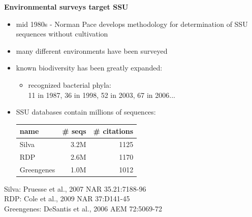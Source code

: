 \documentclass[landscape]{slides}
\begin{document}
\begin{slide}
\begin{center}

\textbf{Environmental surveys target SSU}
\end{center}
\medskip
\begin{minipage}{7in}
\small
\begin{itemize}
\item mid 1980s - Norman Pace develops methodology for determination
      of SSU sequences without cultivation
\item many different environments have been surveyed
\item known biodiversity has been greatly expanded:

\begin{itemize}
\item
  recognized bacterial phyla: \\
  11 in 1987, 36 in 1998, 52 in 2003, 67 in 2006...
\end{itemize}

\item SSU databases contain millions of sequences:
\begin{center}
\begin{tabular}{lrr}
  name & \# seqs & \# citations \\ \hline
  Silva & 3.2M & 1125 \\ 
  RDP   & 2.6M & 1170 \\
  Greengenes & 1.0M & 1012 \\
\end{tabular}
\end{center}
\end{itemize}

\tiny
Silva: Pruesse et al., 2007 NAR 35.21:7188-96 \\
RDP: Cole et al., 2009 NAR 37:D141-45 \\
Greengenes: DeSantis et al., 2006 AEM 72:5069-72 \\


\end{minipage}
\end{slide}
\end{document}
